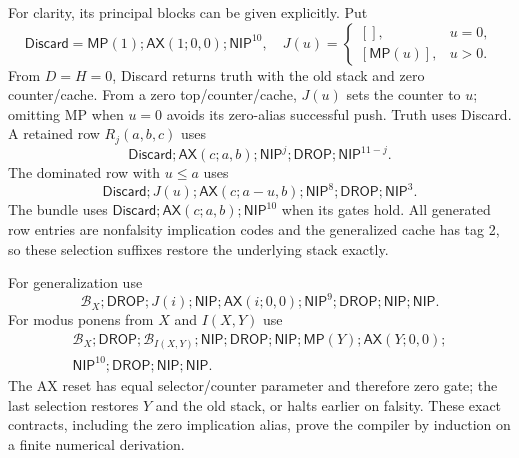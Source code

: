 For clarity, its principal blocks can be given explicitly. Put
\[
\mathsf{Discard}=\mathsf{MP}(1);\mathsf{AX}(1;0,0);\mathsf{NIP}^{10},
\quad J(u)=\begin{cases}[],&u=0,\\{}[\mathsf{MP}(u)],&u>0.\end{cases}
\]
From $D=H=0$, Discard returns truth with the old stack and zero counter/cache. From a zero top/counter/cache, $J(u)$ sets the counter to $u$; omitting MP when $u=0$ avoids its zero-alias successful push. Truth uses Discard. A retained row $R_j(a,b,c)$ uses
\[
\mathsf{Discard};\mathsf{AX}(c;a,b);\mathsf{NIP}^j;
\mathsf{DROP};\mathsf{NIP}^{11-j}.
\]
The dominated row with $u\le a$ uses
\[
\mathsf{Discard};J(u);\mathsf{AX}(c;a-u,b);
\mathsf{NIP}^8;\mathsf{DROP};\mathsf{NIP}^{3}.
\]
The bundle uses $\mathsf{Discard};\mathsf{AX}(c;a,b);\mathsf{NIP}^{10}$ when its gates hold. All generated row entries are nonfalsity implication codes and the generalized cache has tag 2, so these selection suffixes restore the underlying stack exactly.

For generalization use
\[
\mathcal B_X;\mathsf{DROP};J(i);\mathsf{NIP};\mathsf{AX}(i;0,0);
\mathsf{NIP}^{9};\mathsf{DROP};\mathsf{NIP};\mathsf{NIP}.
\]
For modus ponens from $X$ and $I(X,Y)$ use
\begin{multline*}
\mathcal B_X;\mathsf{DROP};\mathcal B_{I(X,Y)};
\mathsf{NIP};\mathsf{DROP};\mathsf{NIP};\mathsf{MP}(Y);\mathsf{AX}(Y;0,0);\\
\mathsf{NIP}^{10};\mathsf{DROP};\mathsf{NIP};\mathsf{NIP}.
\end{multline*}
The AX reset has equal selector/counter parameter and therefore zero gate; the last selection restores $Y$ and the old stack, or halts earlier on falsity. These exact contracts, including the zero implication alias, prove the compiler by induction on a finite numerical derivation.

